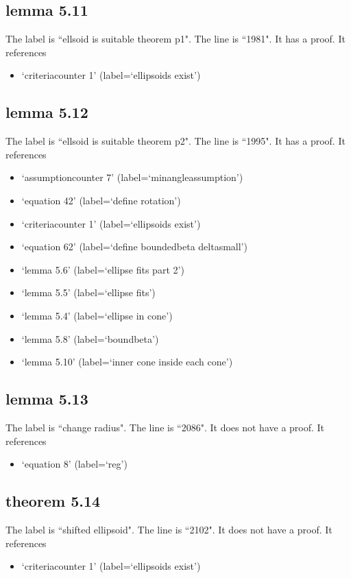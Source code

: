 \documentclass{article}
\begin{document}
\subsection{lemma 5.11}
The label is ``ellsoid is suitable theorem p1".
The line is ``1981".
It has a proof.
It references \begin{itemize}
\item `criteriacounter 1' (label=`ellipsoids exist')
\end{itemize}
\subsection{lemma 5.12}
The label is ``ellsoid is suitable theorem p2".
The line is ``1995".
It has a proof.
It references \begin{itemize}
\item `assumptioncounter 7' (label=`minangleassumption')
\item `equation 42' (label=`define rotation')
\item `criteriacounter 1' (label=`ellipsoids exist')
\item `equation 62' (label=`define boundedbeta deltasmall')
\item `lemma 5.6' (label=`ellipse fits part 2')
\item `lemma 5.5' (label=`ellipse fits')
\item `lemma 5.4' (label=`ellipse in cone')
\item `lemma 5.8' (label=`boundbeta')
\item `lemma 5.10' (label=`inner cone inside each cone')
\end{itemize}
\subsection{lemma 5.13}
The label is ``change radius".
The line is ``2086".
It does not have a proof.
It references \begin{itemize}
\item `equation 8' (label=`reg')
\end{itemize}
\subsection{theorem 5.14}
The label is ``shifted ellipsoid".
The line is ``2102".
It does not have a proof.
It references \begin{itemize}
\item `criteriacounter 1' (label=`ellipsoids exist')
\end{itemize}
\end{document}
